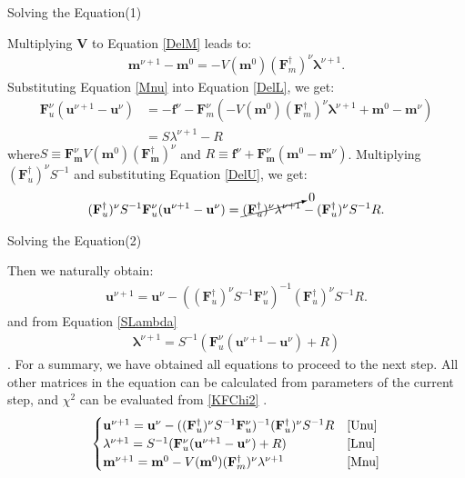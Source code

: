 \documentclass[
	xcolor=dvipsnames,
	10pt, 
	]{beamer}
\begin{document}
\begin{frame}{Solving the Equation(1)}
	\begin{block}{}
		Multiplying \textbf V to Equation \eqref{DelM} leads to:		\vspace{-2 mm}
		\begin{align}
			\mathbf{m}^{\nu+1}-\mathbf{m}^0=-V(\mathbf m^0)(\mathbf{F}_m^\dagger)^\nu\mathbf\lambda^{\nu+1}.\label{Mnu}
		\end{align}
		Substituting Equation \eqref{Mnu} into Equation \eqref{DelL}, we get:\vspace{-2 mm}
		\begin{align}
			\mathbf F^\nu_u(\mathbf u^{\nu+1}-\mathbf u^\nu) &= - \mathbf f^\nu - \mathbf F^\nu_m (-V(\mathbf m^0)(\mathbf{F}_m^\dagger)^\nu\mathbf\lambda^{\nu+1} +\mathbf{m}^0-\mathbf{m}^\nu  )\nonumber\\
			&=  S\lambda^{\nu+1}  - R\label{SLambda}
		\end{align}
		where$S\equiv \mathbf{F}_\mathbf{m}^\nu V(\mathbf m^0)(\mathbf{F}_\mathbf{m}^\dagger )^\nu$  and $R\equiv \mathbf f^\nu + \mathbf{F}_\mathbf{m}^\nu(\mathbf{m}^0-\mathbf{m}^\nu)$. Multiplying $(\mathbf{F}_u^\dagger)^\nu S^{-1}$ and substituting Equation \eqref{DelU}, we get:\vspace{-2 mm}
		\begin{align}
			(\mathbf{F}_u^\dagger)^\nu S^{-1}\mathbf F^\nu_u(\mathbf u^{\nu+1}-\mathbf u^\nu) = \cancelto{0}{(\mathbf F_u^\dagger)^\nu\mathbf \lambda^{\nu+1}}-(\mathbf{F}_u^\dagger)^\nu S^{-1}R.
		\end{align}
	\end{block}
\end{frame}
\begin{frame}{Solving the Equation(2)}
	\begin{block}{}
		Then we naturally obtain:
		\begin{align}
			\mathbf{u}^{\nu+1}=\mathbf{u}^\nu - ((\mathbf{F}_u^\dagger)^\nu S^{-1}\mathbf F^\nu_u)^{-1}(\mathbf{F}_u^\dagger)^\nu S^{-1}R\label{Unu}.
		\end{align} 
		and from Equation \eqref{SLambda}
		\begin{align}
			\mathbf\lambda^{\nu+1} = S^{-1}(\mathbf F^\nu_u(\mathbf u^{\nu+1}-\mathbf u^\nu) + R)\label{Lnu}
		\end{align}.
		For a summary, we have obtained all equations to proceed to the next step. All other matrices in the equation can be calculated from parameters of the current step, and $\chi^2$ can be evaluated from \eqref{KFChi2} .
		\begin{align*}
			\begin{cases}
				\mathbf{u}^{\nu+1}=\mathbf{u}^\nu - ((\mathbf{F}_u^\dagger)^\nu S^{-1}\mathbf F^\nu_u)^{-1}(\mathbf{F}_u^\dagger)^\nu S^{-1}R&\eqref{Unu}\\
				\mathbf\lambda^{\nu+1} = S^{-1}(\mathbf F^\nu_u(\mathbf u^{\nu+1}-\mathbf u^\nu) + R)&\eqref{Lnu}\\
				\mathbf{m}^{\nu+1}=\mathbf{m}^0-V(\mathbf m^0)(\mathbf{F}_m^\dagger)^\nu\mathbf\lambda^{\nu+1}&\eqref{Mnu}
			\end{cases}
		\end{align*}
	\end{block}
\end{frame}
\end{document}
